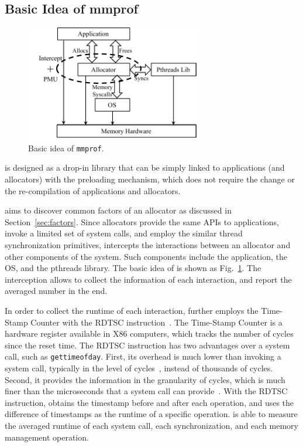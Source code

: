 \subsection{Basic Idea of mmprof}

\begin{figure}[!ht]
\centering
\includegraphics[width=3in]{figures/overview}
\caption{Basic idea of \texttt{mmprof}.\label{fig:basicidea}}
\end{figure}

\MP{} is designed as a drop-in library that can be simply linked to applications (and allocators) with the preloading mechanism, which does not require the change or the re-compilation of applications and allocators.

\MP{} aims to discover common factors of an  allocator as discussed in Section~\ref{sec:factors}. Since allocators provide the same APIs to applications, invoke a limited set of system calls, and employ the similar thread synchronization primitives, \MP{} intercepts the interactions between an allocator and other components of the system. Such components include the application, the OS, and the pthreads library. The basic idea of \MP{} is shown as Fig.~\ref{fig:basicidea}. The interception allows \MP{} to collect the information of each interaction, and report the averaged number in the end. 

In order to collect the runtime of each interaction, \MP{} further employs the Time-Stamp Counter with the RDTSC instruction~\cite{coorporation1997using, weaver2013linux}. The Time-Stamp Counter is a hardware register available in X86 computers, which tracks the number of cycles since the reset time. The RDTSC instruction has two advantages over a system call, such as \texttt{gettimeofday}. First, its overhead is much lower than invoking a system call, typically in the level of  cycles~\cite{rdtscoverhead}, instead of thousands of cycles. Second, it provides the information in the granularity of cycles, which is much finer than the microseconds that a system call can provide~\cite{pitfallsrdtsc}. With the RDTSC instruction, \MP{} obtains the timestamp before and after each operation, and uses the difference of timestamps as the runtime of a specific operation. \MP{} is able to measure the averaged runtime of each system call, each synchronization, and each memory management operation. 

